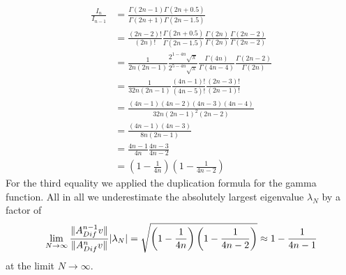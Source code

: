 \documentclass{scrartcl}
\DeclarePairedDelimiter\abs{\lvert}{\rvert}%
\DeclarePairedDelimiter\norm{\lVert}{\rVert}%
\begin{document}
\begin{align*}
\frac{I_n}{I_{n-1}} &= 
\frac{\Gamma(2n - 1)\Gamma(2n + 0.5)}{\Gamma(2n + 1)\Gamma(2n - 1.5)} \\&=   
\frac{(2n - 2)!}{(2n)!}
\frac{\Gamma(2n + 0.5)}{\Gamma(2n - 1.5)}
\frac{\Gamma(2n)}{\Gamma(2n)}
\frac{\Gamma(2n-2)}{\Gamma(2n-2)} \\&=
\frac{1}{2n(2n-1)} 
\frac{2^{1-4n}\sqrt\pi}{2^{5-4n}\sqrt\pi}
\frac{\Gamma(4n)}{\Gamma(4n-4)}
\frac{\Gamma(2n-2)}{\Gamma(2n)} \\&=
\frac{1}{32n(2n-1)} 
\frac{(4n-1)!}{(4n-5)!}
\frac{(2n-3)!}{(2n-1)!} \\&=
\frac{(4n-1)(4n-2)(4n-3)(4n-4)}{32n(2n-1)^2(2n-2)} \\&=
\frac{(4n-1)(4n-3)}{8n(2n-1)} \\&=
\frac{4n-1}{4n}\frac{4n-3}{4n-2} \\&=
\left(1-\frac{1}{4n}\right)\left(1-\frac{1}{4n-2}\right)
\end{align*}
For the third equality we applied the duplication formula for the gamma function. All in all we underestimate the absolutely largest eigenvalue $\lambda_N$ by a factor of 
\[
\lim_{N\to\infty}\frac{\norm{A_{Dif}^{n-1}v}}{\norm{A_{Dif}^{n}v}}\abs{\lambda_N} =
\sqrt{\left(1-\frac{1}{4n}\right)\left(1-\frac{1}{4n-2}\right)} \approx
1-\frac{1}{4n-1}
\]
at the limit $N\to\infty$. 
\end{document}
